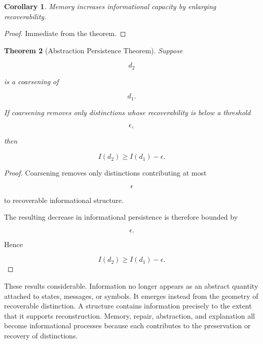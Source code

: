 \documentclass[12pt,oneside]{article}
\newtheorem{theorem}{Theorem}[section] \newtheorem{lemma}[theorem]{Lemma} \newtheorem{proposition}[theorem]{Proposition} \newtheorem{corollary}[theorem]{Corollary}
\theoremstyle{definition}
\begin{document}
\begin{corollary}

Memory increases informational capacity by enlarging recoverability.

\end{corollary}

\begin{proof}

Immediate from the theorem.

\end{proof}

\begin{theorem}[Abstraction Persistence Theorem]

Suppose

\[
d_2
\]

is a coarsening of

\[
d_1.
\]

If coarsening removes only distinctions whose recoverability is below a threshold

\[
\epsilon,
\]

then

\[
I(d_2)
\ge
I(d_1)-\epsilon.
\]

\end{theorem}

\begin{proof}

Coarsening removes only distinctions contributing at most

\[
\epsilon
\]

to recoverable informational structure.

The resulting decrease in informational persistence is therefore bounded by

\[
\epsilon.
\]

Hence

\[
I(d_2)
\ge
I(d_1)-\epsilon.
\]

\end{proof}

These results considerable. Information no longer appears as an abstract quantity attached to states, messages, or symbols. It emerges instead from the geometry of recoverable distinction. A structure contains information precisely to the extent that it supports reconstruction. Memory, repair, abstraction, and explanation all become informational processes because each contributes to the preservation or recovery of distinctions.
\end{document}
